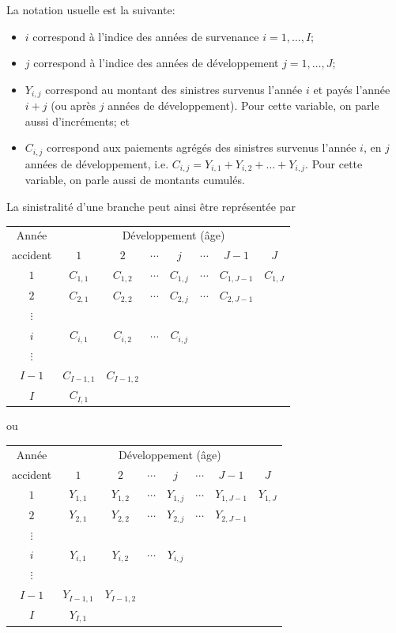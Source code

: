 La notation usuelle est la suivante:
\begin{itemize}
\item $i$ correspond à l'indice des années de survenance
  $i = 1, \ldots, I$;
\item $j$ correspond à l'indice des années de développement
  $j = 1, \ldots, J$;
\item $Y_{i,j}$ correspond au montant des sinistres survenus l'année
  $i$ et payés l'année $i + j$ (ou après $j$ années de développement).
  Pour cette variable, on parle aussi d'incréments; et
\item $C_{i,j}$ correspond aux paiements agrégés des sinistres
  survenus l'année $i$, en $j$ années de développement, i.e.
  $C_{i,j} = Y_{i,1} + Y_{i,2} + \ldots + Y_{i,j}$. Pour cette
  variable, on parle aussi de montants cumulés.
\end{itemize}

La sinistralité d'une branche peut ainsi être représentée par
\begin{center}
  \begin{tabular}{*{8}{c}}
    \toprule
    Année & \multicolumn{7}{c}{Développement (âge)} \\
    accident & $1$ & $2$ & $\cdots$ & $j$ & $\cdots$ & $J - 1$ & $J$ \\
    \midrule
    $1$ & $C_{1, 1}$ & $C_{1, 2}$ & $\cdots$ & $C_{1, j}$ & $\cdots$ & $C_{1, J-1}$ & $C_{1, J}$ \\
    $2$ & $C_{2, 1}$ & $C_{2, 2}$ & $\cdots$ & $C_{2, j}$ & $\cdots$ & $C_{2, J-1}$ \\
    $\vdots$ \\
    $i$ & $C_{i, 1}$ & $C_{i, 2}$ & $\cdots$ & $C_{i, j}$ \\
    $\vdots$ \\
    $I - 1$ & $C_{I-1, 1}$ & $C_{I-1, 2}$ \\
    $I$ & $C_{I, 1}$ \\
    \bottomrule
  \end{tabular}
\end{center}
ou
\begin{center}
  \begin{tabular}{*{8}{c}}
    \toprule
    Année & \multicolumn{7}{c}{Développement (âge)} \\
    accident & $1$ & $2$ & $\cdots$ & $j$ & $\cdots$ & $J - 1$ & $J$ \\
    \midrule
    $1$ & $Y_{1, 1}$ & $Y_{1, 2}$ & $\cdots$ & $Y_{1, j}$ & $\cdots$ & $Y_{1, J-1}$ & $Y_{1, J}$ \\
    $2$ & $Y_{2, 1}$ & $Y_{2, 2}$ & $\cdots$ & $Y_{2, j}$ & $\cdots$ & $Y_{2, J-1}$ \\
    $\vdots$ \\
    $i$ & $Y_{i, 1}$ & $Y_{i, 2}$ & $\cdots$ & $Y_{i, j}$ \\
    $\vdots$ \\
    $I - 1$ & $Y_{I-1, 1}$ & $Y_{I-1, 2}$ \\
    $I$ & $Y_{I, 1}$ \\
    \bottomrule
  \end{tabular}
\end{center}

